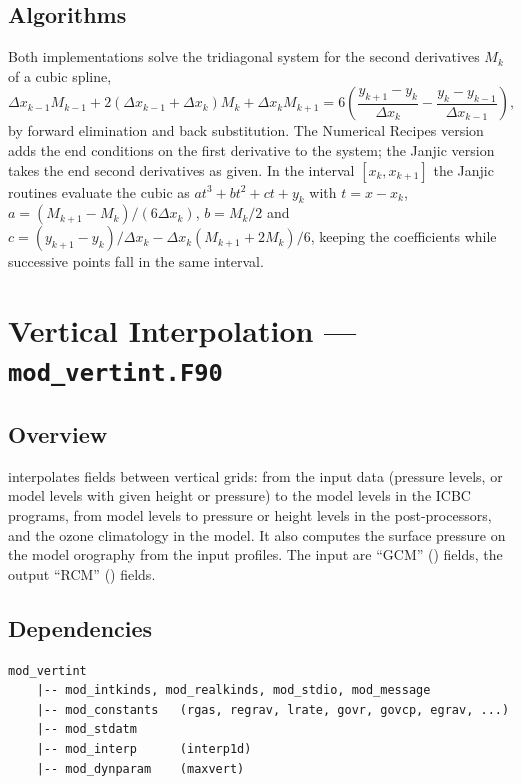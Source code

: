 \subsection{Algorithms}

Both implementations solve the tridiagonal system for the second
derivatives $M_k$ of a cubic spline,
\begin{equation}
  \Delta x_{k-1} M_{k-1} + 2(\Delta x_{k-1}+\Delta x_k) M_k +
  \Delta x_k M_{k+1} = 6\left(\frac{y_{k+1}-y_k}{\Delta x_k} -
  \frac{y_k-y_{k-1}}{\Delta x_{k-1}}\right),
\end{equation}
by forward elimination and back substitution. The Numerical Recipes
version adds the end conditions on the first derivative to the system; the
Janjic version takes the end second derivatives as given. In the interval
$[x_k, x_{k+1}]$ the Janjic routines evaluate the cubic as
$a t^3 + b t^2 + c t + y_k$ with $t = x - x_k$,
$a = (M_{k+1}-M_k)/(6\Delta x_k)$, $b = M_k/2$ and
$c = (y_{k+1}-y_k)/\Delta x_k - \Delta x_k(M_{k+1}+2M_k)/6$, keeping the
coefficients while successive points fall in the same interval.

\section{Vertical Interpolation --- \texttt{mod\_vertint.F90}}
\label{sec:vertint}

\subsection{Overview}

 interpolates fields between vertical grids: from the
input data (pressure levels, or model levels with given height or
pressure) to the model levels in the ICBC programs, from model levels to
pressure or height levels in the post-processors, and the ozone
climatology in the model. It also computes the surface pressure on the
model orography from the input profiles. The input are ``GCM'' ()
fields, the output ``RCM'' () fields.

\subsection{Dependencies}

\begin{lstlisting}
mod_vertint
    |-- mod_intkinds, mod_realkinds, mod_stdio, mod_message
    |-- mod_constants   (rgas, regrav, lrate, govr, govcp, egrav, ...)
    |-- mod_stdatm
    |-- mod_interp      (interp1d)
    |-- mod_dynparam    (maxvert)
\end{lstlisting}

